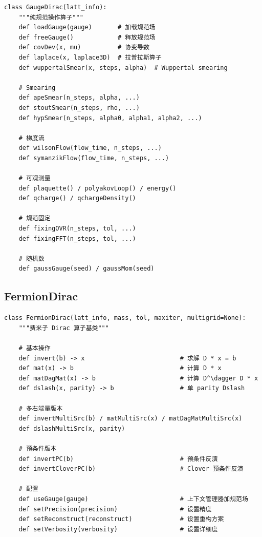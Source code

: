 \documentclass[12pt,a4paper]{ctexart}
\begin{document}
\begin{lstlisting}[style=pycode]
class GaugeDirac(latt_info):
    """纯规范操作算子"""
    def loadGauge(gauge)       # 加载规范场
    def freeGauge()            # 释放规范场
    def covDev(x, mu)          # 协变导数
    def laplace(x, laplace3D)  # 拉普拉斯算子
    def wuppertalSmear(x, steps, alpha)  # Wuppertal smearing

    # Smearing
    def apeSmear(n_steps, alpha, ...)
    def stoutSmear(n_steps, rho, ...)
    def hypSmear(n_steps, alpha0, alpha1, alpha2, ...)

    # 梯度流
    def wilsonFlow(flow_time, n_steps, ...)
    def symanzikFlow(flow_time, n_steps, ...)

    # 可观测量
    def plaquette() / polyakovLoop() / energy()
    def qcharge() / qchargeDensity()

    # 规范固定
    def fixingOVR(n_steps, tol, ...)
    def fixingFFT(n_steps, tol, ...)

    # 随机数
    def gaussGauge(seed) / gaussMom(seed)
\end{lstlisting}

\subsection{FermionDirac}

\begin{lstlisting}[style=pycode]
class FermionDirac(latt_info, mass, tol, maxiter, multigrid=None):
    """费米子 Dirac 算子基类"""

    # 基本操作
    def invert(b) -> x                          # 求解 D * x = b
    def mat(x) -> b                             # 计算 D * x
    def matDagMat(x) -> b                       # 计算 D^\dagger D * x
    def dslash(x, parity) -> b                  # 单 parity Dslash

    # 多右端量版本
    def invertMultiSrc(b) / matMultiSrc(x) / matDagMatMultiSrc(x)
    def dslashMultiSrc(x, parity)

    # 预条件版本
    def invertPC(b)                             # 预条件反演
    def invertCloverPC(b)                       # Clover 预条件反演

    # 配置
    def useGauge(gauge)                         # 上下文管理器加规范场
    def setPrecision(precision)                 # 设置精度
    def setReconstruct(reconstruct)             # 设置重构方案
    def setVerbosity(verbosity)                 # 设置详细度
\end{lstlisting}
\end{document}
